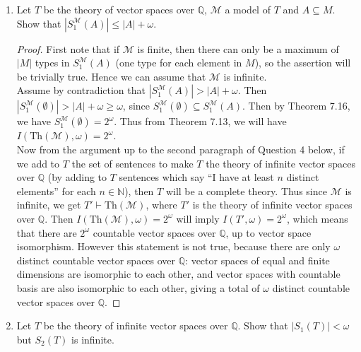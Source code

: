 \documentclass{article}
\begin{document}
\begin{enumerate}[label={\bf Q\arabic*:}]
  \item Let $T$ be the theory of vector spaces over $\mathbb{Q}$,
    $\mathcal{M}$ a model of $T$ and $A\subseteq M$. Show that
    $|S^{\mathcal{M}}_1(A)|\leq|A|+\omega$.

    \begin{proof}
      First note that if $\mathcal{M}$ is finite, then there can only be a
      maximum of $|M|$ types in $S^{\mathcal{M}}_1(A)$ (one type for each
      element in $M$), so the assertion will be trivially true. Hence we
      can assume that $\mathcal{M}$ is infinite. \\

      Assume by contradiction that $|S^{\mathcal{M}}_1(A)|>|A|+\omega$.
      Then $|S^{\mathcal{M}}_1(\emptyset)|>|A|+\omega\geq\omega$, since
      $S^{\mathcal{M}}_1(\emptyset)\subseteq S^{\mathcal{M}}_1(A)$. Then by
      Theorem 7.16, we have $S^{\mathcal{M}}_1(\emptyset)=2^\omega$. Thus
      from Theorem 7.13, we will have
      $I(\text{Th}(\mathcal{M}),\omega)=2^\omega$. \\

      Now from the argument up to the second paragraph of Question 4 below,
      if we add to $T$ the set of sentences to make $T$ the theory of
      infinite vector spaces over $\mathbb{Q}$ (by adding to $T$
      sentences which say ``I have at least $n$ distinct elements'' for
      each $n\in\mathbb{N}$), then $T$ will be a complete theory. Thus
      since $\mathcal{M}$ is infinite, we get
      $T'\vdash\text{Th}(\mathcal{M})$, where $T'$ is the theory of
      infinite vector spaces over $\mathbb{Q}$. Then
      $I(\text{Th}(\mathcal{M}),\omega)=2^\omega$ will imply
      $I(T',\omega)=2^\omega$, which means that there are $2^\omega$
      countable vector spaces over $\mathbb{Q}$, up to vector space
      isomorphism. However this statement is not true, because there are
      only $\omega$ distinct countable vector spaces over $\mathbb{Q}$: 
      vector spaces of equal and finite dimensions are isomorphic to each
      other, and vector spaces with countable basis are also isomorphic to
      each other, giving a total of $\omega$ distinct countable vector
      spaces over $\mathbb{Q}$.
    \end{proof}

  \item Let $T$ be the theory of infinite vector spaces over $\mathbb{Q}$.
    Show that $|S_1(T)|<\omega$ but $S_2(T)$ is infinite.


\end{enumerate}
\end{document}
